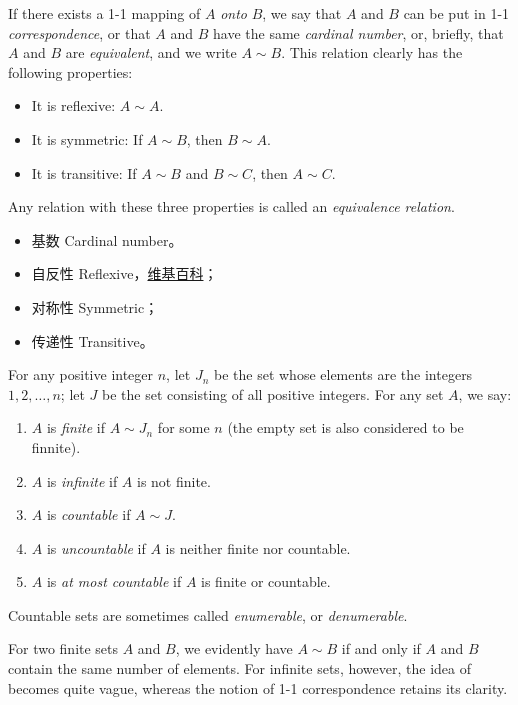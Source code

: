 \documentclass[../poma-notes.tex]{subfiles}
\begin{document}
\begin{definition}
  If there exists a 1-1 mapping of $A$ \textit{onto} $B$, we say that $A$ and $B$ can be put in 1-1 \textit{correspondence},
  or that $A$ and $B$ have the same \textit{cardinal number}, or, briefly, that $A$ and $B$ are \textit{equivalent},
  and we write $A \sim B$. This relation clearly has the following properties:
  \begin{itemize}
    \item[] It is reflexive: $A \sim A$.
    \item[] It is symmetric: If $A \sim B$, then $B \sim A$.
    \item[] It is transitive: If $A \sim B$ and $B \sim C$, then $A \sim C$.
  \end{itemize}
  Any relation with these three properties is called an \textit{equivalence relation}.
\end{definition}

\begin{anote}
  \begin{itemize}
    \item 基数 Cardinal number。
    \item 自反性 Reflexive，\href{https://en.wikipedia.org/wiki/Reflexive_relation}{维基百科}；
    \item 对称性 Symmetric；
    \item 传递性 Transitive。
  \end{itemize}
\end{anote}

\begin{definition}
  For any positive integer $n$, let $J_n$ be the set whose elements are the integers $1,2,\dots,n$; let $J$ be
  the set consisting of all positive integers. For any set $A$, we say:
  \begin{enumerate}[label=(\alph*)]
    \item $A$ is \textit{finite} if $A \sim J_n$ for some $n$ (the empty set is also considered to be finnite).
    \item $A$ is \textit{infinite} if $A$ is not finite.
    \item $A$ is \textit{countable} if $A \sim J$.
    \item $A$ is \textit{uncountable} if $A$ is neither finite nor countable.
    \item $A$ is \textit{at most countable} if $A$ is finite or countable.
  \end{enumerate}

  Countable sets are sometimes called \textit{enumerable}, or \textit{denumerable}.

  For two finite sets $A$ and $B$, we evidently have $A \sim B$ if and only if $A$ and $B$ contain the same number of
  elements. For infinite sets, however, the idea of  becomes quite vague,
  whereas the notion of 1-1 correspondence retains its clarity.
\end{definition}
\end{document}
